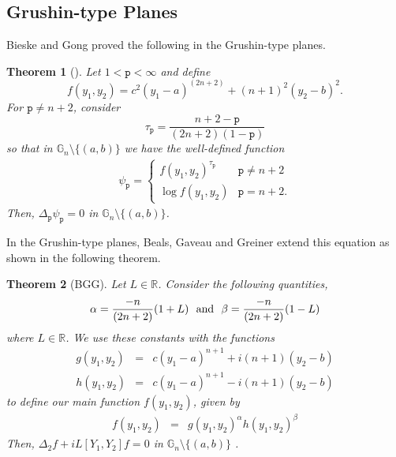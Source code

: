 \documentclass[12pt]{amsart}
\theoremstyle{plain}
\newtheorem{theorem}{Theorem}[section]
\theoremstyle{definition}
\numberwithin{equation}{section}
\begin{document}
\subsection{Grushin-type Planes}
Bieske and Gong \cite{BG} proved the following in the Grushin-type planes.
\begin{theorem}[\cite{BG}]\label{T6}
Let $1<{\texttt{p}}<\infty$ and define $$f(y_1,y_2)=c^2(y_1-a)^{(2n+2)}+(n+1)^2 (y_2-b)^2.$$  
For ${\texttt{p}} \neq n+2$, consider $$\tau_{\texttt{p}}=\frac{n+2-{\texttt{p}}}{(2n+2)(1-{\texttt{p}})}$$
so that in $\mathbb{G}_n\setminus\{(a,b)\}$  we have the well-defined function
\begin{eqnarray*}
\psi_{\texttt{p}}=\left\{\begin{array}{cc}
f(y_1,y_2)^{\tau_{\texttt{p}}} & {\texttt{p}} \neq n+2 \\
\log f(y_1,y_2) & {\texttt{p}} = n+2.
\end{array}\right.
\end{eqnarray*}
Then, $\Delta_{\texttt{p}}\psi_{\texttt{p}}=0$ in $\mathbb{G}_n\setminus\{(a,b)\}$.
\end{theorem} 
In the Grushin-type planes, Beals, Gaveau and Greiner \cite{BGG} extend this equation as shown in the following theorem. 
\begin{theorem}[BGG]\label{MG}
Let $L \in \mathbb{R}$. Consider the following quantities,
\begin{equation*}
\alpha = \frac{-n}{(2n+2)}(1+L) \ \ \textmd{and}\ \ \beta  =  \frac{-n}{(2n+2)}(1-L)
\end{equation*}
where $L\in\mathbb{R}$.
We use these constants with the functions
\begin{eqnarray*}
g(y_1,y_2) & = & c(y_1-a)^{n+1}+i(n+1)(y_2-b)\\ 
h(y_1,y_2) & = & c(y_1-a)^{n+1}-i(n+1)(y_2-b)
\end{eqnarray*}
to define our main function $f(y_1,y_2)$, given by
\begin{eqnarray*}
f(y_1,y_2) & = & g(y_1,y_2)^{\alpha}h(y_1,y_2)^{\beta}
\end{eqnarray*}
Then, $\Delta_{2}f+iL[Y_1,Y_2]f=0$ in $\mathbb{G}_n\setminus\{(a,b)\}$ .
\end{theorem}
\end{document}
